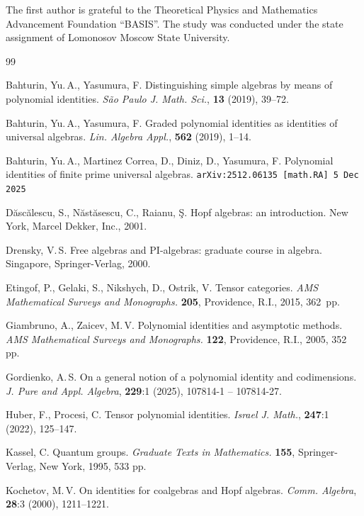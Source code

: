 \documentclass[12pt, reqno, a4paper]{amsart}
\theoremstyle{plain}
\theoremstyle{remark}
\theoremstyle{definition}
\numberwithin{equation}{section}
\begin{document}
The first author is grateful to the Theoretical Physics and Mathematics Advancement Foundation ``BASIS''.
The study was conducted under the state assignment of Lomonosov Moscow State University.

\begin{thebibliography}{99}

 Bahturin, Yu.\,A., Yasumura, F.  Distinguishing simple algebras by means of polynomial identities.
\textit{S\~ao Paulo J. Math. Sci.}, \textbf{13} (2019), 39--72.

 Bahturin, Yu.\,A., Yasumura, F. Graded polynomial identities as identities of universal algebras.
\textit{Lin. Algebra Appl.}, \textbf{562} (2019), 1--14.

 Bahturin, Yu.\,A., Martinez Correa, D., Diniz, D., Yasumura, F.  Polynomial identities of finite prime universal algebras. \texttt{arXiv:2512.06135 [math.RA] 5 Dec 2025}

 D\u asc\u alescu, S., N\u ast\u asescu, C., Raianu, \c S.
Hopf algebras: an introduction. New York, Marcel Dekker, Inc., 2001.


 Drensky, V.\,S.
Free algebras and PI-algebras: graduate course in algebra.
Singapore, Springer-Verlag, 2000.

 Etingof, P., Gelaki, S., Nikshych, D., Ostrik, V. Tensor categories.
\textit{AMS Mathematical Surveys and Monographs.} \textbf{205},
Providence, R.I., 2015, 362~pp.


 Giambruno, A., Zaicev, M.\,V.
Polynomial identities and asymptotic methods.
\textit{AMS Mathematical Surveys and Monographs.} \textbf{122},
Providence, R.I., 2005, 352 pp.

Gordienko, A.\,S.
On a general notion of a polynomial identity and codimensions.
\textit{J. Pure and Appl. Algebra}, \textbf{229}:1 (2025), 107814-1 -- 107814-27.

 Huber, F., Procesi, C. Tensor polynomial identities. \textit{Israel J. Math.}, \textbf{247}:1 (2022), 125--147.

 Kassel, C. Quantum groups. \textit{Graduate Texts in Mathematics.}
\textbf{155}, Springer-Verlag, New York, 1995, 533 pp.

 Kochetov, M.\,V. On identities for coalgebras and Hopf algebras.
\textit{Comm. Algebra}, \textbf{28}:3 (2000), 1211--1221.


\end{thebibliography}
\end{document}
